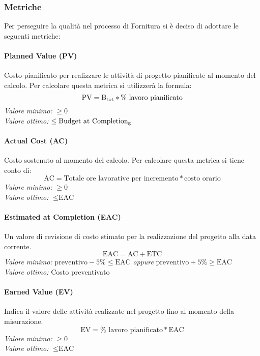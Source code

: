 \subsubsection{Metriche}
Per perseguire la qualità nel processo di Fornitura si è deciso di adottare le seguenti metriche:
\paragraph{Planned Value (PV)}
Costo pianificato per realizzare le attività di progetto pianificate al momento del calcolo.
Per calcolare questa metrica si utilizzerà la formula:
\begin{equation*}
\text{PV}=\text{B}\textsubscript{tot}*\%\text{ lavoro pianificato}
\end{equation*}
\textit{Valore minimo:} $\ge 0$\\
\textit{Valore ottimo:}	$\le \text{Budget at Completion\textsubscript{g}}$
\paragraph{Actual Cost (AC)}
Costo sostenuto al momento del calcolo.
Per calcolare questa metrica si tiene conto di:
\begin{equation*}
\text{AC}=\text{Totale ore lavorative per incremento}*\text{costo orario}
\end{equation*}
\textit{Valore minimo:} $\ge 0$\\
\textit{Valore ottimo:} $\le \text{EAC}$
\paragraph{Estimated at Completion (EAC)}
Un valore di revisione di costo stimato per la realizzazione del progetto alla data corrente.
\begin{equation*}
\text{EAC}=\text{AC}+\text{ETC}
\end{equation*}
\textit{Valore minimo:} 
$\text{preventivo} -5\% \le \text{EAC}$ \textit{oppure} $\text{preventivo} +5\% \ge \text{EAC}$\\
\textit{Valore ottimo:} Costo preventivato
\paragraph{Earned Value (EV)}
Indica il valore delle attività realizzate nel progetto fino al momento della misurazione.
\begin{equation*}
\text{EV}=\%\text{ lavoro pianificato}*\text{EAC}
\end{equation*}
\textit{Valore minimo:} $\ge 0$\\
\textit{Valore ottimo:} $\le \text{EAC}$
